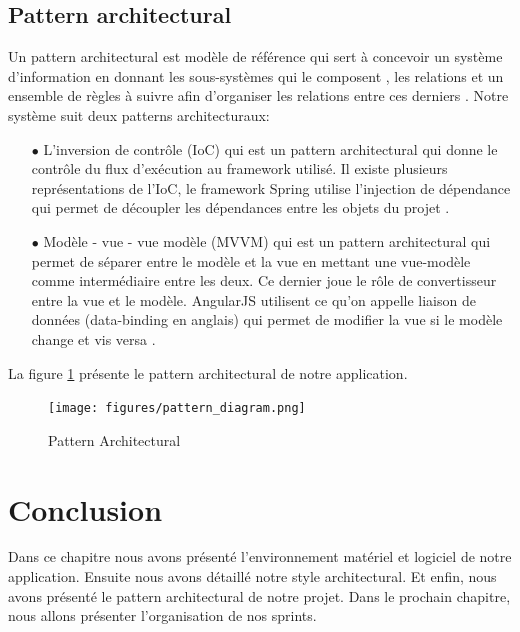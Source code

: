 \subsection{Pattern architectural}
Un pattern architectural est modèle de référence qui sert à concevoir un système d'information en donnant les sous-systèmes qui le composent , les relations et un ensemble de règles à suivre afin d'organiser les relations entre ces derniers \cite{PatternArchitectural}.
Notre système suit deux patterns architecturaux:\\
\begin{itemize}
    \item[$\bullet$] L’inversion de contrôle (IoC) qui est un pattern architectural qui donne le contrôle du flux d'exécution au framework utilisé. Il existe plusieurs représentations de l'IoC, le framework Spring utilise l'injection de dépendance qui permet de découpler les dépendances entre les objets du projet \cite{IoC}.
    \item[$\bullet$] Modèle - vue - vue modèle (MVVM) qui est un pattern architectural qui permet de séparer entre le modèle et la vue en mettant une vue-modèle comme intermédiaire entre les deux. Ce dernier joue le rôle de convertisseur entre la vue et le modèle. AngularJS utilisent ce qu'on appelle liaison de données (data-binding en anglais) qui permet de modifier la vue si le modèle change et vis versa \cite{MVVM}.\\
\end{itemize}
La figure \ref{code55} présente le pattern architectural de notre application.
\begin{figure}[H]
  \centering
  \texttt{[image: figures/pattern\_diagram.png]}
  \caption{Pattern Architectural}
  \label{code55}
\end{figure}
\section{Conclusion}
Dans ce chapitre nous avons présenté l'environnement matériel et logiciel de notre application. Ensuite nous avons détaillé notre style architectural. Et enfin, nous avons présenté le pattern architectural de notre projet. Dans le prochain chapitre, nous allons présenter l'organisation de nos sprints.